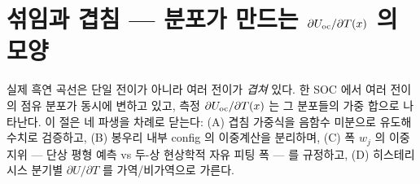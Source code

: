 \section{섞임과 겹침 --- 분포가 만드는 $\partial U_{\mathrm{oc}}/\partial T(x)$ 의 모양}\label{sec:mixing}

실제 흑연 곡선은 단일 전이가 아니라 여러 전이가 \emph{겹쳐} 있다. 한 SOC 에서 여러 전이의 점유 분포가
동시에 변하고 있고, 측정 $\partial U_{\mathrm{oc}}/\partial T(x)$ 는 그 분포들의 가중 합으로 나타난다. 이 절은 네 파생을
차례로 닫는다: (A) 겹침 가중식을 음함수 미분으로 유도해 수치로 검증하고, (B) 봉우리 내부 config 의 이중계산을
분리하며, (C) 폭 $w_j$ 의 이중지위 --- 단상 평형 예측 vs 두-상 현상학적 자유 피팅 폭 --- 를 규정하고, (D)
히스테리시스 분기별 $\partial U/\partial T$ 를 가역/비가역으로 가른다.

